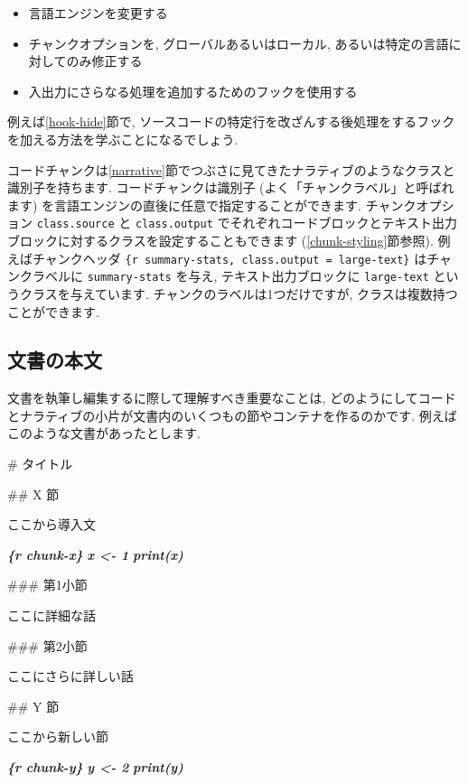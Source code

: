\documentclass[
  11pt,
]{bxjsreport}
\newenvironment{Shaded}{\begin{snugshade}}{\end{snugshade}}
\newcommand{\FunctionTok}[1]{\textcolor[rgb]{0.00,0.00,0.00}{#1}}
\newcommand{\InformationTok}[1]{\textcolor[rgb]{0.56,0.35,0.01}{\textbf{\textit{#1}}}}
\newcommand{\NormalTok}[1]{#1}
\begin{document}
\begin{itemize}
\item
  言語エンジンを変更する
\item
  チャンクオプションを, グローバルあるいはローカル, あるいは特定の言語に対してのみ修正する
\item
  入出力にさらなる処理を追加するためのフックを使用する
\end{itemize}

例えば\ref{hook-hide}節で, ソースコードの特定行を改ざんする後処理をするフックを加える方法を学ぶことになるでしょう.

コードチャンクは\ref{narrative}節でつぶさに見てきたナラティブのようなクラスと識別子を持ちます. コードチャンクは識別子 (よく「チャンクラベル」と呼ばれます) を言語エンジンの直後に任意で指定することができます. チャンクオプション \texttt{class.source} と \texttt{class.output} でそれぞれコードブロックとテキスト出力ブロックに対するクラスを設定することもできます (\ref{chunk-styling}節参照). 例えばチャンクヘッダ \texttt{\textasciigrave{}\textasciigrave{}\textasciigrave{}\{r\ summary-stats,\ class.output\ =\ \textquotesingle{}large-text\textquotesingle{}\}} はチャンクラベルに \texttt{summary-stats} を与え, テキスト出力ブロックに \texttt{large-text} というクラスを与えています. チャンクのラベルは1つだけですが, クラスは複数持つことができます.

\hypertarget{document-body}{%
\subsection{文書の本文}\label{document-body}}

文書を執筆し編集するに際して理解すべき重要なことは, どのようにしてコードとナラティブの小片が文書内のいくつもの節やコンテナを作るのかです. 例えばこのような文書があったとします.

\begin{Shaded}
\begin{Highlighting}[]
\FunctionTok{\# タイトル}

\FunctionTok{\#\# X 節}

\NormalTok{ここから導入文}

\InformationTok{\textasciigrave{}\textasciigrave{}\textasciigrave{}\{r chunk{-}x\}}
\InformationTok{x \textless{}{-} 1}
\InformationTok{print(x)}
\InformationTok{\textasciigrave{}\textasciigrave{}\textasciigrave{}}

\FunctionTok{\#\#\# 第1小節}

\NormalTok{ここに詳細な話}

\FunctionTok{\#\#\# 第2小節}

\NormalTok{ここにさらに詳しい話}

\FunctionTok{\#\# Y 節}

\NormalTok{ここから新しい節}

\InformationTok{\textasciigrave{}\textasciigrave{}\textasciigrave{}\{r chunk{-}y\}}
\InformationTok{y \textless{}{-} 2}
\InformationTok{print(y)}
\InformationTok{\textasciigrave{}\textasciigrave{}\textasciigrave{}}
\end{Highlighting}
\end{Shaded}
\end{document}

